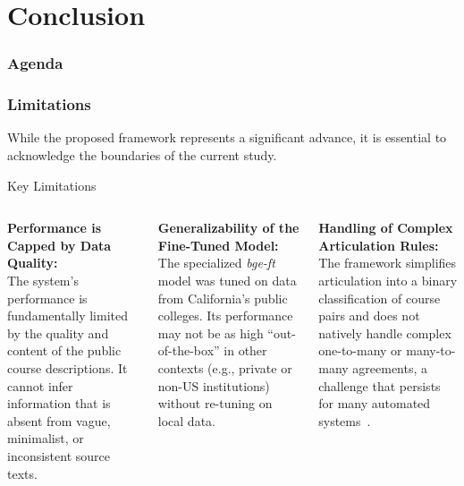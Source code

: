 \documentclass[aspectratio=169,10pt]{beamer}
\begin{document}
\section{Conclusion}
\begin{frame}
    \frametitle{Agenda}
    \tableofcontents[currentsection]
\end{frame}

\begin{frame}
    \frametitle{Limitations}
    
    While the proposed framework represents a significant advance, it is essential to acknowledge the boundaries of the current study.
    
    \vspace{1mm}
    \begin{block}{Key Limitations}
        \hfill\vspace{-2mm}
        \begin{columns}[T]
            \begin{column}{0.3\textwidth}
                \textbf{Performance is Capped by Data Quality:}\\\vspace{1mm}
                The system's performance is fundamentally limited by the quality and content of the public course descriptions. It cannot infer information that is absent from vague, minimalist, or inconsistent source texts.
            \end{column}
            \hfill
            \begin{column}{0.3\textwidth}
                \textbf{Generalizability of the Fine-Tuned Model:}\\\vspace{1mm}
                The specialized \textit{bge-ft} model was tuned on data from California's public colleges. Its performance may not be as high ``out-of-the-box'' in other contexts (e.g., private or non-US institutions) without re-tuning on local data.
            \end{column}
            \hfill
            \begin{column}{0.3\textwidth}
                \textbf{Handling of Complex Articulation Rules:}\\\vspace{1mm}
                The framework simplifies articulation into a binary classification of course pairs and does not natively handle complex one-to-many or many-to-many agreements, a challenge that persists for many automated systems~\cite{pardos-articulation-2019}.
            \end{column}
        \end{columns}
    \end{block}
    
\end{frame}
\end{document}
